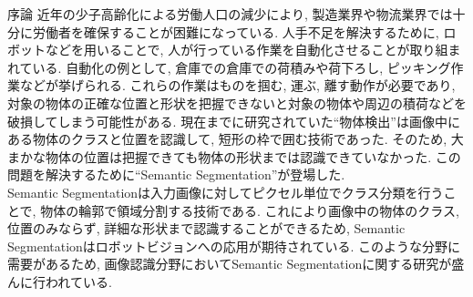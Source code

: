 \begin{chapter}{序論}
    近年の少子高齢化による労働人口の減少により, 製造業界や物流業界では十分に労働者を確保することが困難になっている. 人手不足を解決するために, ロボットなどを用いることで, 人が行っている作業を自動化させることが取り組まれている. 自動化の例として, 倉庫での倉庫での荷積みや荷下ろし, ピッキング作業などが挙げられる. これらの作業はものを掴む, 運ぶ, 離す動作が必要であり, 対象の物体の正確な位置と形状を把握できないと対象の物体や周辺の積荷などを破損してしまう可能性がある. 現在までに研究されていた``物体検出''\cite{rcnn}\cite{yolo}は画像中にある物体のクラスと位置を認識して, 短形の枠で囲む技術であった. そのため, 大まかな物体の位置は把握できても物体の形状までは認識できていなかった. この問題を解決するために``Semantic Segmentation''\cite{semaseg}\cite{semaseg2}が登場した. \\
    Semantic Segmentationは入力画像に対してピクセル単位でクラス分類を行うことで, 物体の輪郭で領域分割する技術である. これにより画像中の物体のクラス, 位置のみならず, 詳細な形状まで認識することができるため, Semantic Segmentationはロボットビジョンへの応用が期待されている. このような分野に需要があるため, 画像認識分野においてSemantic Segmentationに関する研究が盛んに行われている.



    
\end{chapter}
  